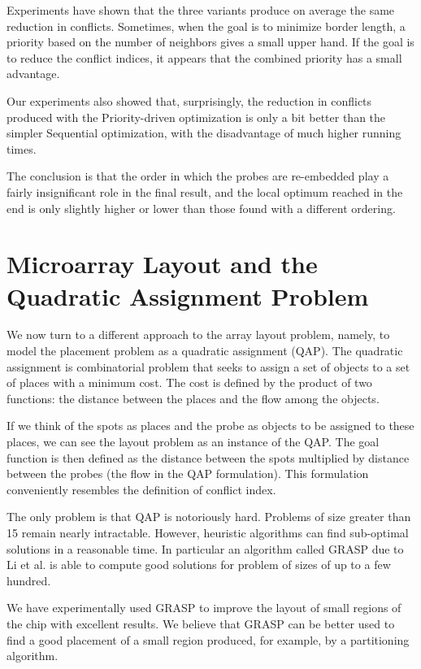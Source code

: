 \documentclass{article}
\begin{document}
Experiments have shown that the three variants produce on average the same reduction in conflicts. Sometimes, when the goal is to minimize border length, a priority based on the number of neighbors gives a small upper hand. If the goal is to reduce the conflict indices, it appears that the combined priority has a small advantage. 

Our experiments also showed that, surprisingly, the reduction in conflicts produced with the Priority-driven optimization is only a bit better than the simpler Sequential optimization, with the disadvantage of much higher running times. 

The conclusion is that the order in which the probes are re-embedded play a fairly insignificant role in the final result, and the local optimum reached in the end is only slightly higher or lower than those found with a different ordering. 

\section{Microarray Layout and the Quadratic Assignment Problem}

We now turn to a different approach to the array layout problem, namely, to model the placement problem as a quadratic assignment (QAP). The quadratic assignment is combinatorial problem that seeks to assign a set of objects to a set of places with a minimum cost. The cost is defined by the product of two functions: the distance between the places and the flow among the objects. 

If we think of the spots as places and the probe as objects to be assigned to these places, we can see the layout problem as an instance of the QAP. The goal function is then defined as the distance between the spots multiplied by distance between the probes (the flow in the QAP formulation). This formulation conveniently resembles the definition of conflict index. 

The only problem is that QAP is notoriously hard. Problems of size greater than 15 remain nearly intractable. However, heuristic algorithms can find sub-optimal solutions in a reasonable time. In particular an algorithm called GRASP due to Li et al. \cite{GRASP} is able to compute good solutions for problem of sizes of up to a few hundred. 

We have experimentally used GRASP to improve the layout of small regions of the chip with excellent results. We believe that GRASP can be better used to find a good placement of a small region produced, for example, by a partitioning algorithm. 
\end{document}
